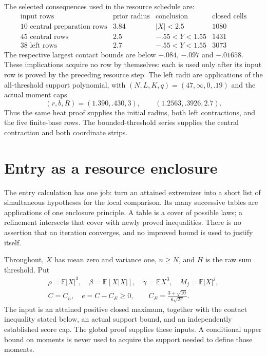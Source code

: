 \documentclass[11pt,a4paper]{article}
\numberwithin{equation}{section}
\theoremstyle{definition}
\theoremstyle{remark}
\newcommand{\E}{\mathbb E}
\begin{document}
The selected consequences used in the resource schedule are:
\[
\begin{array}{l|c|c|r}
\text{input rows}&\text{prior radius}&\text{conclusion}&\text{closed cells}\\\hline
10\text{ central preparation rows}&3.84&|X|<2.5&1080\\
45\text{ central rows}&2.5&-.55<Y<1.55&1431\\
38\text{ left rows}&2.7&-.55<Y<1.55&3073
\end{array}
\]
The respective largest contact bounds are below $-.084$, $-.097$ and
$-.01658$. These implications acquire no row by themselves: each is
used only after its input row is proved by the preceding resource step.
The left radii are applications of the all-threshold support polynomial,
with $(N,L,K,q)=(47,\infty,0,.19)$ and the actual moment caps
\[
 (r,b,R)=(1.390,.430,3),\qquad (1.2563,.3926,2.7).
\]
Thus the same heat proof supplies the initial radius, both left
contractions, and the five finite-base rows. The bounded-threshold
series supplies the central contraction and both coordinate strips.

\section{Entry as a resource enclosure}\label{cut49:re:entry}

The entry calculation has one job: turn an attained extremizer into a
short list of simultaneous hypotheses for the local comparison. Its many
successive tables are applications of one enclosure principle. A table
is a cover of possible laws; a refinement intersects that cover with
newly proved inequalities. There is no assertion that an iteration
converges, and no improved bound is used to justify itself.

Throughout, $X$ has mean zero and variance one, $n\ge N$, and $H$ is
the raw sum threshold. Put
\[\begin{gathered}
 \rho=\E|X|^3,\quad \beta=\E[X|X|],\quad\gamma=\E X^3,\quad M_j=\E|X|^j,\\
 C=C_n,\quad e=C-C_E\ge0,\qquad C_E=\frac{3+\sqrt{10}}{6\sqrt{2\pi}}.
\end{gathered}\]
The input is an attained positive closed maximum, together with the
contact inequality stated below, an actual support bound, and an
independently established score cap. The global proof supplies these
inputs. A conditional upper bound on moments is never used to acquire
the support needed to define those moments.
\end{document}
